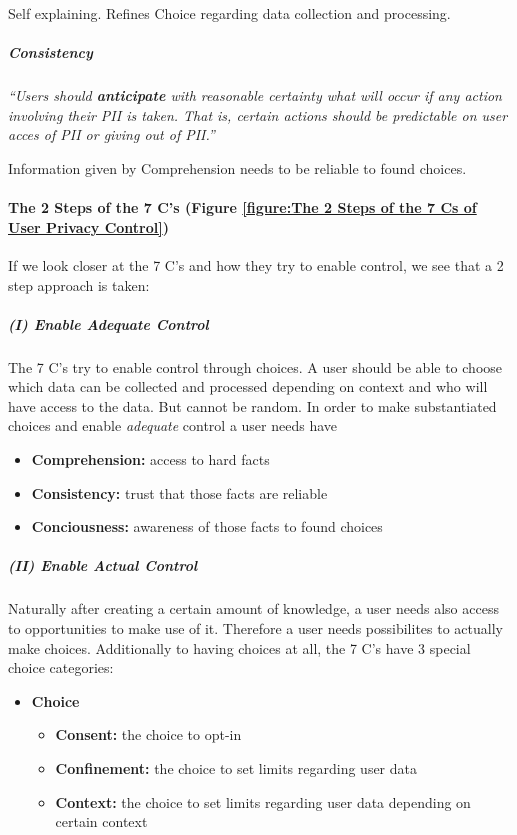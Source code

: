 Self explaining. Refines Choice regarding data collection and
processing.

\subparagraph{Consistency}

\emph{``Users should \textbf{anticipate} with reasonable certainty what
will occur if any action involving their PII is taken. That is, certain
actions should be predictable on user acces of PII or giving out of
PII.''}

Information given by Comprehension needs to be reliable to found
choices.

\paragraph{The 2 Steps of the 7 C's (Figure \ref{figure:The 2 Steps of the 7 Cs of User Privacy Control})}

If we look closer at the 7 C's and how they try to enable control, we
see that a 2 step approach is taken:



\subparagraph{(I) Enable \emph{Adequate} Control}

The 7 C's try to enable control through choices. A user should be able
to choose which data can be collected and processed depending on context
and who will have access to the data. But cannot be random. In order to
make substantiated choices and enable \emph{adequate} control a user
needs have

\begin{itemize}

\item
  \textbf{Comprehension:} access to hard facts
\item
  \textbf{Consistency:} trust that those facts are reliable
\item
  \textbf{Conciousness:} awareness of those facts to found choices
\end{itemize}

\subparagraph{(II) Enable \emph{Actual} Control}

Naturally after creating a certain amount of knowledge, a user needs
also access to opportunities to make use of it. Therefore a user needs
possibilites to actually make choices. Additionally to having choices at
all, the 7 C's have 3 special choice categories:

\begin{itemize}

\item
  \textbf{Choice}
  \begin{itemize}
  \item
    \textbf{Consent:} the choice to opt-in
  \item
    \textbf{Confinement:} the choice to set limits regarding user data
  \item
    \textbf{Context:} the choice to set limits regarding user data
    depending on certain context
  \end{itemize}

\end{itemize}

